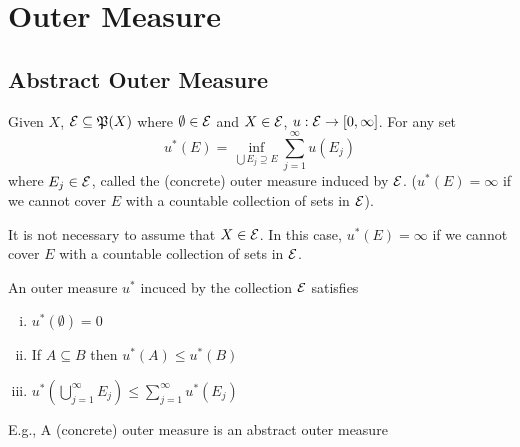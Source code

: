 \chapter{Outer Measure}
\section{Abstract Outer Measure}




\begin{definition}
  Given $X$, $\mathcal E \subseteq \mathfrak{P}(X)$ where $\emptyset \in \mathcal E$ and $X \in \mathcal E$, $u: \mathcal E \to [0, \infty]$.
  For any set 
  \[u^*(E) = \inf_{\bigcup E_j \supseteq E}\sum_{j=1}^\infty u(E_j)\]
  where $E_j \in \mathcal E$, called the (concrete) outer measure induced by $\mathcal E$.
  ($u^*(E) = \infty$ if we cannot cover $E$ with a countable collection of sets in $\mathcal E$).
\end{definition}

\begin{remark}
  It is not necessary to assume that $X \in \mathcal E$.
  In this case, $u^*(E) = \infty$ if we cannot cover $E$ with a countable collection of sets in $\mathcal E$.
\end{remark}

\begin{lemma}
  An outer measure $u^*$ incuced by the collection $\mathcal E$ satisfies
  \begin{enumerate}[(i)]
    \item $u^*(\emptyset) = 0$
    \item If $A \subseteq B$ then $u^*(A) \le u^*(B)$
    \item $u^*(\bigcup_{j=1}^\infty E_j) \le \sum_{j=1}^\infty u^*(E_j)$ 
  \end{enumerate}
  E.g., A (concrete) outer measure is an abstract outer measure
\end{lemma}

